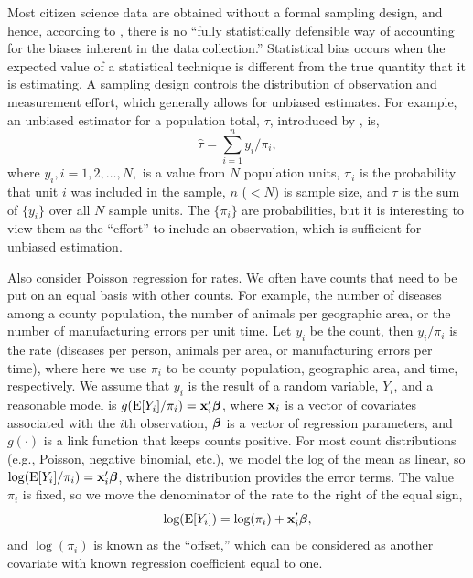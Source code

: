 \documentclass[11pt, titlepage]{article}
\begin{document}
\begin{spacing}{1.9}
\begin{flushleft}
Most citizen science data are obtained without a formal sampling design, and hence, according to \citet{kelling_using_2019}, there is no ``fully statistically defensible way of accounting for the biases inherent in the data collection.'' Statistical bias occurs when the expected value of a statistical technique is different from the true quantity that it is estimating.  A sampling design controls the distribution of observation and measurement effort, which generally allows for unbiased estimates. For example, an unbiased estimator for a population total, $\tau$, introduced by  \citet{horvitz_generalization_1952}, is,
\begin{equation} \label{eq:HorvThom}
  \hat{\tau} = \sum_{i=1}^n y_i/\pi_i,
\end{equation}
where $y_i, i = 1, 2, \ldots, N,$ is a value from $N$ population units, $\pi_i$ is the probability that unit $i$ was included in the sample, $n$ ($< N$) is sample size, and $\tau$ is the sum of $\{y_i\}$ over all $N$ sample units. The $\{\pi_i\}$ are probabilities, but it is interesting to view them as the ``effort'' to include an observation, which is sufficient for unbiased estimation. 

Also consider Poisson regression for rates.  We often have counts that need to be put on an equal basis with other counts.  For example, the number of diseases among a county population, the number of animals per geographic area, or the number of manufacturing errors per unit time.  Let $y_{i}$ be the count, then $y_{i}/\pi_{i}$ is the rate (diseases per person, animals per area, or manufacturing errors per time), where here we use $\pi_{i}$ to be county population, geographic area, and time, respectively.  We assume that $y_{i}$ is the result of a random variable, $Y_{i}$, and a reasonable model is $g(\textrm{E}[Y_{i}]/\pi_{i}) = \mathbf{x}_{i}^{\prime}\mbox{\boldmath $\beta$}$, where $\mathbf{x}_{i}$ is a vector of covariates associated with the $i$th observation, $\mbox{\boldmath $\beta$}$ is a vector of regression parameters, and $g(\cdot)$ is a link function that keeps counts positive.  For most count distributions (e.g., Poisson, negative binomial, etc.), we model the log of the mean as linear, so $\textrm{log}(\textrm{E}[Y_{i}]/\pi_{i}) = \mathbf{x}_{i}^{\prime}\mbox{\boldmath $\beta$}$, where the distribution provides the error terms.  The value $\pi_{i}$ is fixed, so we move the denominator of the rate to the right of the equal sign,
\begin{equation} \label{eq:PoiRegOff}
  \textrm{log}(\textrm{E}[Y_{i}]) = \textrm{log}(\pi_{i}) + \mathbf{x}_{i}^{\prime}\mbox{\boldmath $\beta$},
\end{equation} 
and $\log(\pi_{i})$ is known as the ``offset,'' which can be considered as another covariate with known regression coefficient equal to one.


\end{flushleft}
\end{spacing}
\end{document}
